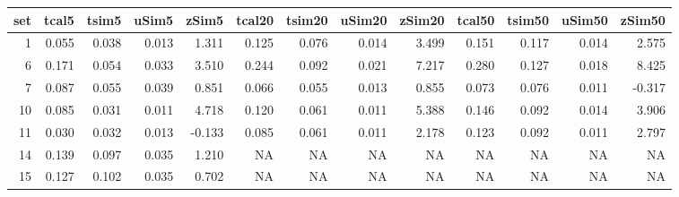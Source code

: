 
\begin{tabular}{r|r|r|r|r|r|r|r|r|r|r|r|r}
\hline
set & tcal5 & tsim5 & uSim5 & zSim5 & tcal20 & tsim20 & uSim20 & zSim20 & tcal50 & tsim50 & uSim50 & zSim50\\
\hline
1 & 0.055 & 0.038 & 0.013 & 1.311 & 0.125 & 0.076 & 0.014 & 3.499 & 0.151 & 0.117 & 0.014 & 2.575\\
\hline
6 & 0.171 & 0.054 & 0.033 & 3.510 & 0.244 & 0.092 & 0.021 & 7.217 & 0.280 & 0.127 & 0.018 & 8.425\\
\hline
7 & 0.087 & 0.055 & 0.039 & 0.851 & 0.066 & 0.055 & 0.013 & 0.855 & 0.073 & 0.076 & 0.011 & -0.317\\
\hline
10 & 0.085 & 0.031 & 0.011 & 4.718 & 0.120 & 0.061 & 0.011 & 5.388 & 0.146 & 0.092 & 0.014 & 3.906\\
\hline
11 & 0.030 & 0.032 & 0.013 & -0.133 & 0.085 & 0.061 & 0.011 & 2.178 & 0.123 & 0.092 & 0.011 & 2.797\\
\hline
14 & 0.139 & 0.097 & 0.035 & 1.210 & NA & NA & NA & NA & NA & NA & NA & NA\\
\hline
15 & 0.127 & 0.102 & 0.035 & 0.702 & NA & NA & NA & NA & NA & NA & NA & NA\\
\hline
\end{tabular}
